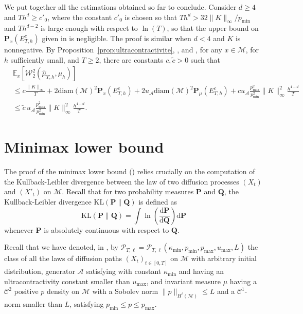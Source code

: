 \documentclass[10pt,a4paper]{article}
\renewcommand{\P}{{\mathbf P}}
\newcommand{\Q}{{\mathbf Q}}
\newcommand\cA{\mathcal{A}}
\newcommand\cC{\mathcal{C}}
\newcommand\cM{\mathcal{M}}
\newcommand\cW{\mathcal{W}}
\newcommand\cP{\mathcal{P}}
\newcommand\dd{\mathrm{d}}
\newcommand{\PAR}[1]{{{\left(#1\right)}}} %
\let \ssection=\section
\renewcommand{\section}{\setcounter{equation}{0}\ssection}
\begin{document}
    
We put together all the estimations obtained so far to conclude. Consider $d\ge 4$ and $Th^{d}\ge c'_0$, where the constant $c'_0$ is chosen so that $Th^d>32\|K\|_\infty/p_{\min}$ and $Th^{d-2}$ is large enough with respect to $\ln(T)$, so that the upper bound on $\P_{x}\PAR{ E_{T,h}^c } $ given in  is negligible. The proof is similar when $d<4$ and $K$ is nonnegative.
By Proposition~\ref{prop:ultracontractivite}, ,  and , for any $x\in\cM$, for $h$ sufficiently small, and $T\ge 2$, there are constants $c,\tilde c>0$ such that
\begin{align*}
&\mathbb{E}_{x} \left[ \cW_2^2( \widehat{\mu}_{T,h},\mu_h) \right] 
\\
&\le c  \frac{ \| K\|_{\infty}}{T} + 2\mathrm{diam}(\cM)^2\P_{x}( E^c_{T,h})+ 2u_\cA\mathrm{diam}(\cM)^2\P_\mu(E^c_{T,h})  + c u_\cA \frac{p_{\max}^2}{p_{\min}^2} \|K\|_\infty^2 \frac{h^{4-d}}T\\
&\le \tilde{c} \, u_\cA\frac{p_{\max}^2}{p_{\min}^2} \|K\|_\infty^2 \frac{h^{4-d}}T.
\end{align*}


    


\section{Minimax lower bound}\label{sec:minimax}

The proof of the minimax lower bound () relies crucially on the computation of the Kullback-Leibler divergence between the law of two diffusion processes $(X_t)$ and $(X'_t)$ on $\cM$. Recall that for two probability measures $\P$ and $\Q$, the Kullback-Leibler divergence $\mathrm{KL}(\P \|\Q)$ is defined as 
\begin{equation}
    \mathrm{KL}(\P \|\Q) = \int \ln \left( \frac{\dd \P}{\dd \Q}\right) \dd \P
\end{equation}
whenever $\P$ is absolutely continuous with respect to $\Q$.

Recall that we have denoted, in , by $\cP_{T,\ell}=\cP_{T,\ell}(\kappa_{\min},p_{\min},p_{\max},u_{\max},L)$ the class of all the laws of diffusion paths $(X_t)_{t\in [0,T]}$ on $\cM$ with arbitrary initial distribution, generator $\cA$ satisfying  with constant $\kappa_{\min}$ and having an ultracontractivity constant smaller than $u_{\max}$, and invariant measure $\mu$  having a $\cC^2$ positive $p$ density on $\cM$ with a Sobolev norm $\|p\|_{H^\ell(\cM)} \le L$ and a $\cC^1$-norm smaller than $L$, satisfying $p_{\min}\le p\le p_{\max}$.
\end{document}

